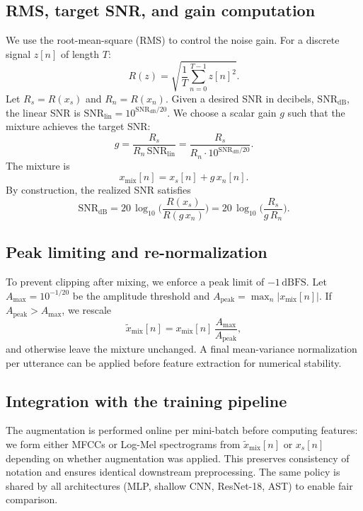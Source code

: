\subsection{RMS, target SNR, and gain computation}
We use the root-mean-square (RMS) to control the noise gain. For a discrete signal \(z[n]\) of length \(T\):
\begin{equation}\label{eq:rms}
R(z) = \sqrt{\frac{1}{T} \sum_{n=0}^{T-1} z[n]^2}.
\end{equation}
Let \(R_s = R(x_s)\) and \(R_n = R(x_n)\). Given a desired SNR in decibels, \(\mathrm{SNR}_{\mathrm{dB}}\), the linear SNR is \(\mathrm{SNR}_{\mathrm{lin}} = 10^{\mathrm{SNR}_{\mathrm{dB}}/20}\). We choose a scalar gain \(g\) such that the mixture achieves the target SNR:
\begin{equation}\label{eq:gain}
g = \frac{R_s}{R_n\, \mathrm{SNR}_{\mathrm{lin}}} = \frac{R_s}{R_n \cdot 10^{\mathrm{SNR}_{\mathrm{dB}}/20}}.
\end{equation}
The mixture is
\begin{equation}\label{eq:mix}
x_{\mathrm{mix}}[n] = x_s[n] + g\, x_n[n].
\end{equation}
By construction, the realized SNR satisfies
\begin{equation}\label{eq:snr_db}
\mathrm{SNR}_{\mathrm{dB}} = 20\, \log_{10} \! \bigg( \frac{R(x_s)}{R(g\,x_n)} \bigg) = 20\, \log_{10} \! \bigg( \frac{R_s}{g\, R_n} \bigg).
\end{equation}

\subsection{Peak limiting and re-normalization}
To prevent clipping after mixing, we enforce a peak limit of \(-1\,\mathrm{dBFS}\). Let \(A_{\max} = 10^{-1/20}\) be the amplitude threshold and \(A_{\mathrm{peak}} = \max_n |x_{\mathrm{mix}}[n]|\). If \(A_{\mathrm{peak}} > A_{\max}\), we rescale
\begin{equation}\label{eq:limit}
\widetilde{x}_{\mathrm{mix}}[n] = x_{\mathrm{mix}}[n]\, \frac{A_{\max}}{A_{\mathrm{peak}}},
\end{equation}
and otherwise leave the mixture unchanged. A final mean-variance normalization per utterance can be applied before feature extraction for numerical stability.

\subsection{Integration with the training pipeline}
The augmentation is performed online per mini-batch before computing features: we form either MFCCs  or Log-Mel spectrograms  from \(\widetilde{x}_{\mathrm{mix}}[n]\) or \(x_s[n]\) depending on whether augmentation was applied. This preserves consistency of notation and ensures identical downstream preprocessing. The same policy is shared by all architectures (MLP, shallow CNN, ResNet-18, AST) to enable fair comparison.

